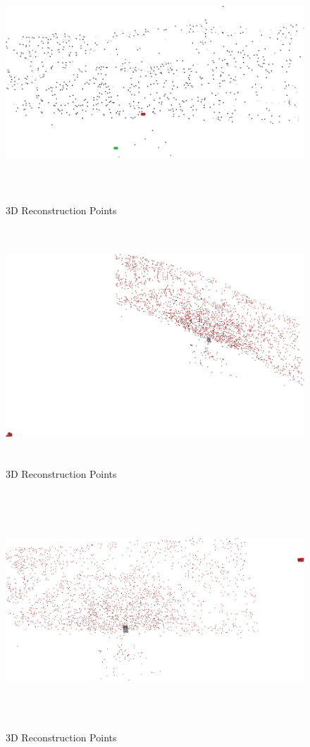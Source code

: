 \documentclass[11pt,psfig]{article}
\begin{document}
\begin{figure}[H]
\centering
\includegraphics[height=3.5in]{sfmResults3/3Dreconstruction1.jpg}
\caption{3D Reconstruction Points}
\end{figure}
\begin{figure}[H]
\centering
\includegraphics[height=3.5in]{sfmResults3/3DreconstructionFromMany1.jpg}
\caption{3D Reconstruction Points}
\end{figure}
\begin{figure}[H]
\centering
\includegraphics[height=3.5in]{sfmResults3/3DreconstructionFromMany2.jpg}
\caption{3D Reconstruction Points}
\end{figure}
\end{document}
